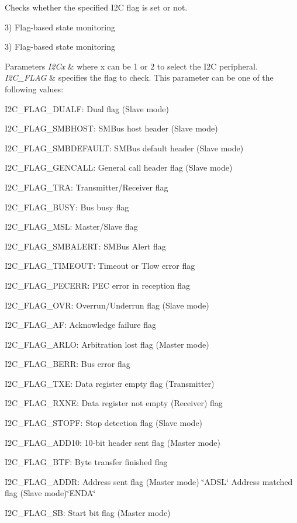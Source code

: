 Checks whether the specified I2C flag is set or not. 

3) Flag-\/based state monitoring

3) Flag-\/based state monitoring 
\begin{DoxyParams}{Parameters}
{\em I2\+Cx} & where x can be 1 or 2 to select the I2C peripheral. \\
\hline
{\em I2\+C\+\_\+\+F\+L\+AG} & specifies the flag to check. This parameter can be one of the following values\+: \begin{DoxyItemize}
\item I2\+C\+\_\+\+F\+L\+A\+G\+\_\+\+D\+U\+A\+LF\+: Dual flag (Slave mode) \item I2\+C\+\_\+\+F\+L\+A\+G\+\_\+\+S\+M\+B\+H\+O\+ST\+: S\+M\+Bus host header (Slave mode) \item I2\+C\+\_\+\+F\+L\+A\+G\+\_\+\+S\+M\+B\+D\+E\+F\+A\+U\+LT\+: S\+M\+Bus default header (Slave mode) \item I2\+C\+\_\+\+F\+L\+A\+G\+\_\+\+G\+E\+N\+C\+A\+LL\+: General call header flag (Slave mode) \item I2\+C\+\_\+\+F\+L\+A\+G\+\_\+\+T\+RA\+: Transmitter/\+Receiver flag \item I2\+C\+\_\+\+F\+L\+A\+G\+\_\+\+B\+U\+SY\+: Bus busy flag \item I2\+C\+\_\+\+F\+L\+A\+G\+\_\+\+M\+SL\+: Master/\+Slave flag \item I2\+C\+\_\+\+F\+L\+A\+G\+\_\+\+S\+M\+B\+A\+L\+E\+RT\+: S\+M\+Bus Alert flag \item I2\+C\+\_\+\+F\+L\+A\+G\+\_\+\+T\+I\+M\+E\+O\+UT\+: Timeout or Tlow error flag \item I2\+C\+\_\+\+F\+L\+A\+G\+\_\+\+P\+E\+C\+E\+RR\+: P\+EC error in reception flag \item I2\+C\+\_\+\+F\+L\+A\+G\+\_\+\+O\+VR\+: Overrun/\+Underrun flag (Slave mode) \item I2\+C\+\_\+\+F\+L\+A\+G\+\_\+\+AF\+: Acknowledge failure flag \item I2\+C\+\_\+\+F\+L\+A\+G\+\_\+\+A\+R\+LO\+: Arbitration lost flag (Master mode) \item I2\+C\+\_\+\+F\+L\+A\+G\+\_\+\+B\+E\+RR\+: Bus error flag \item I2\+C\+\_\+\+F\+L\+A\+G\+\_\+\+T\+XE\+: Data register empty flag (Transmitter) \item I2\+C\+\_\+\+F\+L\+A\+G\+\_\+\+R\+X\+NE\+: Data register not empty (Receiver) flag \item I2\+C\+\_\+\+F\+L\+A\+G\+\_\+\+S\+T\+O\+PF\+: Stop detection flag (Slave mode) \item I2\+C\+\_\+\+F\+L\+A\+G\+\_\+\+A\+D\+D10\+: 10-\/bit header sent flag (Master mode) \item I2\+C\+\_\+\+F\+L\+A\+G\+\_\+\+B\+TF\+: Byte transfer finished flag \item I2\+C\+\_\+\+F\+L\+A\+G\+\_\+\+A\+D\+DR\+: Address sent flag (Master mode) \char`\"{}\+A\+D\+S\+L\char`\"{} Address matched flag (Slave mode)\char`\"{}\+E\+N\+D\+A\char`\"{} \item I2\+C\+\_\+\+F\+L\+A\+G\+\_\+\+SB\+: Start bit flag (Master mode) \end{DoxyItemize}

\end{DoxyParams}
